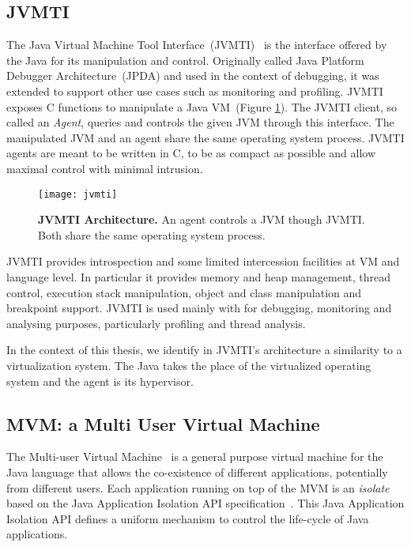 \subsection*{JVMTI}
The Java Virtual Machine Tool Interface~(JVMTI)~\cite{JVMPI} is the interface offered by the Java \VM for its manipulation and control. Originally called Java Platform Debugger Architecture~(JPDA) and used in the context of debugging, it was extended to support other use cases such as monitoring and profiling.
JVMTI exposes C functions to manipulate a Java VM~(Figure \ref{fig:jvmti}). The JVMTI client, so called an \emph{Agent}, queries and controls the given JVM through this interface. The manipulated JVM and an agent share the same operating system process. JVMTI agents are meant to be written in C, to be as compact as possible and allow maximal control with minimal intrusion.

\begin{figure}[ht]
\begin{center}
\texttt{[image: jvmti]}
\caption{\textbf{JVMTI Architecture.} An agent controls a JVM though JVMTI. Both share the same operating system process.\label{fig:jvmti}}
\end{center}
\end{figure}

JVMTI provides introspection and some limited intercession facilities at VM and language level. In particular it provides memory and heap management, thread control, execution stack manipulation, object and class manipulation and breakpoint support. JVMTI is used mainly with for debugging, monitoring and analysing purposes, particularly profiling and thread analysis.

In the context of this thesis, we identify in JVMTI's architecture a similarity to a virtualization system. The Java \VM takes the place of the virtualized operating system and the agent is its hypervisor.

\subsection*{MVM: a Multi User Virtual Machine}
The Multi-user Virtual Machine~\cite{Czaj03a,Czaj01a} is a general purpose virtual machine for the Java language that allows the co-existence of different applications, potentially from different users. Each application running on top of the MVM is an \emph{isolate} based on the Java Application Isolation API specification~\cite{JSR121}. This Java Application Isolation API defines a uniform mechanism to control the life-cycle of Java applications.

